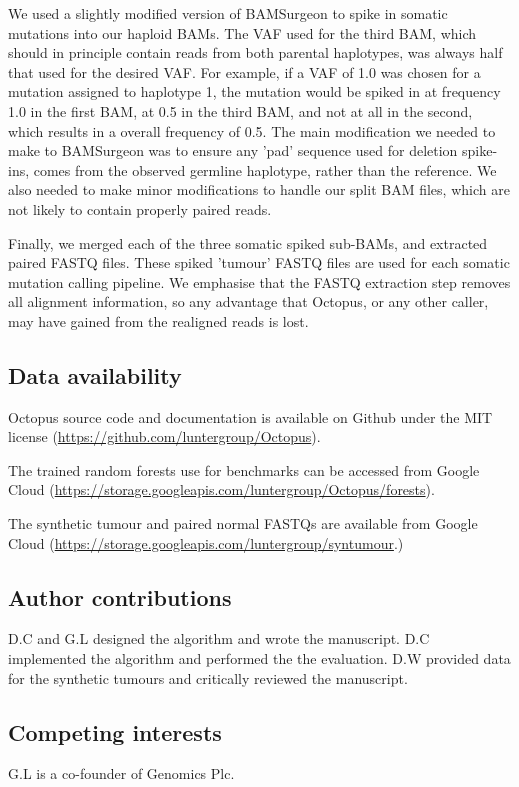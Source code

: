 \documentclass[notitlepage, twocolumn]{article}
\begin{document}
We used a slightly modified version of BAMSurgeon to spike in somatic mutations into our haploid BAMs. The VAF used for the third BAM, which should in principle contain reads from both parental haplotypes, was always half that used for the desired VAF. For example, if a VAF of 1.0 was chosen for a mutation assigned to haplotype 1, the mutation would be spiked in at frequency 1.0 in the first BAM, at 0.5 in the third BAM, and not at all in the second, which results in a overall frequency of 0.5. The main modification we needed to make to BAMSurgeon was to ensure any 'pad' sequence used for deletion spike-ins, comes from the observed germline haplotype, rather than the reference. We also needed to make minor modifications to handle our split BAM files, which are not likely to contain properly paired reads.

Finally, we merged each of the three somatic spiked sub-BAMs, and extracted paired FASTQ files. These spiked 'tumour' FASTQ files are used for each somatic mutation calling pipeline. We emphasise that the FASTQ extraction step removes all alignment information, so any advantage that Octopus, or any other caller, may have gained from the realigned reads is lost.

\subsection*{Data availability}

Octopus source code and documentation is available on Github under the MIT license (\url{https://github.com/luntergroup/Octopus}).

The trained random forests use for benchmarks can be accessed from Google Cloud (\url{https://storage.googleapis.com/luntergroup/Octopus/forests}).

The synthetic tumour and paired normal FASTQs are available from Google Cloud (\url{https://storage.googleapis.com/luntergroup/syntumour}.)

\subsection*{Author contributions}

D.C and G.L designed the algorithm and wrote the manuscript. D.C implemented the algorithm and performed the the evaluation. D.W provided data for the synthetic tumours and critically reviewed the manuscript. 

\subsection*{Competing interests}

G.L is a co-founder of Genomics Plc.  
\end{document}
